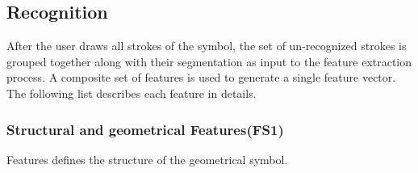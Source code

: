 \documentclass{article}
\begin{document}
\subsection{Recognition}
\label{sec:Recognition}
After the user draws all strokes of the symbol, the set of un-recognized strokes is grouped together along with their segmentation as input to the feature extraction process. A composite set of features is used to generate a single feature vector. The following list describes each feature in details.
\subsubsection{Structural and geometrical Features(FS1)}
  Features defines the structure of the geometrical symbol.  
%
\end{document}
